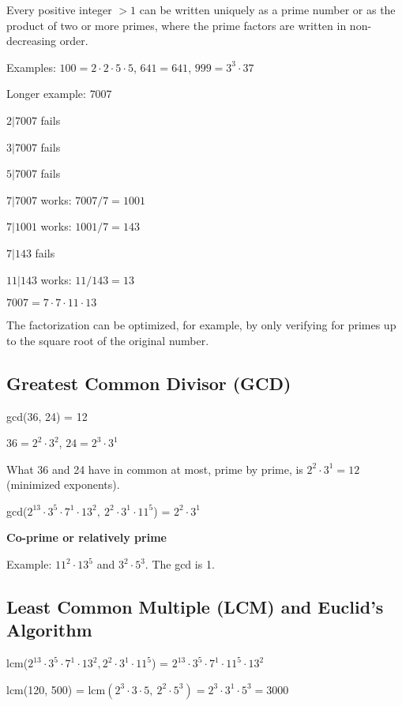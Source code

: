\documentclass[english,openany]{book}
\begin{document}
    Every positive integer $>1$ can be written uniquely as a prime number or as the product of two or more primes, where the prime factors are written in non-decreasing order.

    Examples: $100 = 2 \cdot 2 \cdot 5 \cdot 5$, $641 = 641$, $999 = 3^3 \cdot 37$

    Longer example: $7007$

    $2|7007$ fails

    $3|7007$ fails

    $5|7007$ fails

    $7|7007$ works: $7007/7 = 1001$

    $7|1001$ works: $1001/7 = 143$

    $7|143$ fails

    $11|143$ works: $11/143 = 13$

    $7007 = 7 \cdot 7 \cdot 11 \cdot 13$

    The factorization can be optimized, for example, by only verifying for primes up to the square root of the original number.\\

    \subsection{Greatest Common Divisor (GCD)}

    gcd(36, 24) = 12

    $36 = 2^2 \cdot 3^2$, $24 = 2^3 \cdot 3^1$

    What 36 and 24 have in common at most, prime by prime, is $2^2 \cdot 3^1 = 12$ (minimized exponents).

    gcd($2^{13} \cdot 3^5 \cdot 7^1 \cdot 13^2,\ 2^2 \cdot 3^1 \cdot 11^5$) = $2^2 \cdot 3^1$

     \textbf{Co-prime or relatively prime}

     Example: $11^2 \cdot 13^5$ and $3^2 \cdot 5^3$. The gcd is 1.

     \subsection{Least Common Multiple (LCM) and Euclid's Algorithm}

     lcm($2^{13} \cdot 3^5 \cdot 7^1 \cdot 13^2, 2^2 \cdot 3^1 \cdot 11^5$) = $2^{13} \cdot 3^5 \cdot 7^1 \cdot 11^5 \cdot 13^2$

     lcm(120, 500) = lcm$(2^3 \cdot 3 \cdot 5,\ 2^2 \cdot 5^3) = 2^3 \cdot 3^1 \cdot 5^3 = 3000$\\
\end{document}
